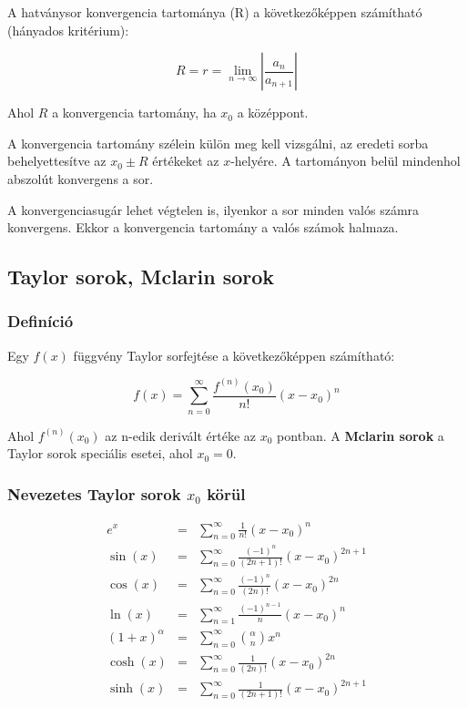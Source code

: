 \documentclass{article}
\begin{document}
\vspace{4mm}

A hatványsor konvergencia tartománya (R) a következőképpen számítható (hányados kritérium):

\begin{equation*}
    R = r =\lim_{n \to \infty} \left\lvert \frac{a_n}{a_{n+1}} \right\rvert
\end{equation*}

Ahol $R$ a konvergencia tartomány, ha $x_0$ a középpont.

\vspace{4mm}

A konvergencia tartomány szélein külön meg kell vizsgálni, az eredeti sorba behelyettesítve az $x_0 \pm R$ értékeket az $x$-helyére. A tartományon belül mindenhol abszolút konvergens a sor.

\vspace{4mm}

A konvergenciasugár lehet végtelen is, ilyenkor a sor minden valós számra konvergens. Ekkor a konvergencia tartomány a valós számok halmaza.

\newpage

\subsection{Taylor sorok, Mclarin sorok}

\subsubsection{Definíció}

Egy $f(x)$ függvény Taylor sorfejtése a következőképpen számítható:

\begin{equation*}
    f(x) = \sum_{n=0}^{\infty} \frac{f^{(n)}(x_0)}{n!} (x - x_0)^n
\end{equation*}

Ahol $f^{(n)}(x_0)$ az n-edik derivált értéke az $x_0$ pontban.
A \textbf{Mclarin sorok} a Taylor sorok speciális esetei, ahol $x_0 = 0$.

\subsubsection{Nevezetes Taylor sorok \texorpdfstring{$x_0$}{x0} körül}

\begin{eqnarray*}
    e^x &=& \sum_{n=0}^{\infty} \frac{1}{n!} (x-x_0)^n \\
    \sin(x) &=& \sum_{n=0}^{\infty} \frac{(-1)^n}{(2n+1)!} (x-x_0)^{2n+1} \\
    \cos(x) &=& \sum_{n=0}^{\infty} \frac{(-1)^n}{(2n)!} (x-x_0)^{2n} \\
    \ln(x) &=& \sum_{n=1}^{\infty} \frac{(-1)^{n-1}}{n} (x-x_0)^n \\
    (1+x)^\alpha &=& \sum_{n=0}^{\infty} \binom{\alpha}{n} x^n \\
    \cosh(x) &=& \sum_{n=0}^{\infty} \frac{1}{(2n)!} (x-x_0)^{2n} \\
    \sinh(x) &=& \sum_{n=0}^{\infty} \frac{1}{(2n+1)!} (x-x_0)^{2n+1} \\
\end{eqnarray*}
\end{document}

